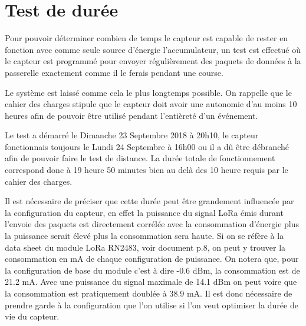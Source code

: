 \section{Test de durée}

Pour pouvoir déterminer combien de temps le capteur est capable de rester en fonction avec comme seule source d'énergie l'accumulateur, un test est effectué  où le capteur est programmé pour envoyer régulièrement des paquets de données à la passerelle exactement comme il le ferais pendant une course.

Le système est laissé comme cela le plus longtemps possible. On rappelle que le cahier des charges stipule que le capteur doit avoir une autonomie d'au moins 10 heures afin de pouvoir être utilisé pendant l'entièreté d'un événement.

Le test a démarré le Dimanche 23 Septembre 2018 à 20h10, le capteur fonctionnais toujours le Lundi 24 Septembre à 16h00 ou il a dû être débranché afin de pouvoir faire le test de distance. La durée totale de fonctionnement correspond donc à 19 heure 50 minutes bien au delà des 10 heure requis par le cahier des charges.

Il est nécessaire de préciser que cette durée peut être grandement influencée par la configuration du capteur, en effet la puissance du signal LoRa émis durant l'envoie des paquets est directement corrélée avec la consommation d'énergie plus la puissance serait élevé plus la consommation sera haute. Si on se réfère à la data sheet du module LoRa RN2483, voir document \cite{rn2483-datasheet-real} p.8, on peut y trouver la consommation en mA de chaque configuration de puissance. On notera que, pour la configuration de base du module c'est à dire -0.6 dBm, la consommation est de 21.2 mA. Avec une puissance du signal maximale de 14.1 dBm on peut voire que la consommation est pratiquement doublée à 38.9 mA. Il est donc nécessaire de prendre garde à la configuration que l'on utilise si l'on veut optimiser la durée de vie du capteur.